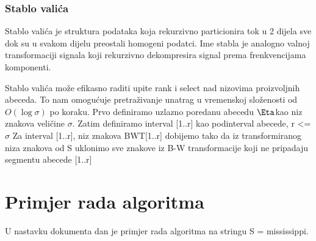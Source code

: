 \documentclass[11pt]{article}
\begin{document}
\newpage

\subsubsection{Stablo valića}

Stablo valića je struktura podataka koja rekurzivno particionira tok u 2 dijela sve dok su u svakom dijelu preostali homogeni podatci. Ime stabla je analogno valnoj transformaciji signala koji rekurzivno dekompresira signal prema frenkvencijama komponenti. 

Stablo valića može efikasno raditi upite rank i select nad nizovima proizvoljnih abeceda. To nam omogućuje pretraživanje unatrag u vremenskoj složenosti od  $O(\log\sigma)$ po koraku.
Prvo definiramo uzlazno poredanu abecedu $\Eta$kao niz znakova veličine $\sigma $.  
Zatim definiramo interval [1..r] kao podinterval abecede, r <= $\sigma$
Za interval [1..r], niz znakova BWT[1..r] dobijemo tako da iz transformiranog niza znakova od S uklonimo sve znakove iz B-W transformacije koji ne pripadaju segmentu abecede [1..r]

\section{Primjer rada algoritma}
U nastavku dokumenta dan je primjer rada algoritma na stringu S = mississippi.
\end{document}
